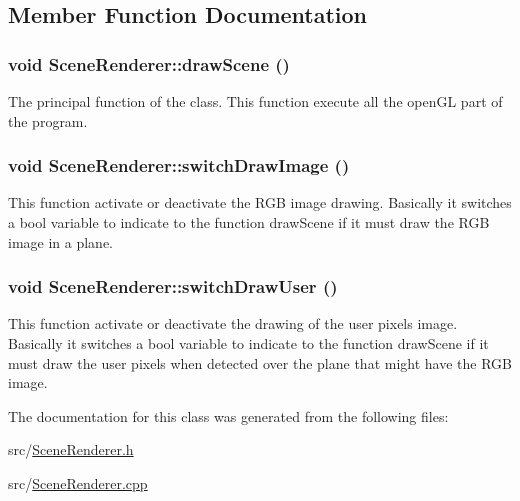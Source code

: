 \subsection{Member Function Documentation}
\hypertarget{classSceneRenderer_ae6ca19a65696503e8dea028219fd3fba}{
\subsubsection[{drawScene}]{\setlength{\rightskip}{0pt plus 5cm}void SceneRenderer::drawScene ()}}
\label{classSceneRenderer_ae6ca19a65696503e8dea028219fd3fba}
The principal function of the class. This function execute all the openGL part of the program. \hypertarget{classSceneRenderer_ab104ce38576705968a1ced2cdd16b178}{
\subsubsection[{switchDrawImage}]{\setlength{\rightskip}{0pt plus 5cm}void SceneRenderer::switchDrawImage ()}}
\label{classSceneRenderer_ab104ce38576705968a1ced2cdd16b178}
This function activate or deactivate the RGB image drawing. Basically it switches a bool variable to indicate to the function drawScene if it must draw the RGB image in a plane. \hypertarget{classSceneRenderer_a43045a5662099ef3064f902566875bcb}{
\subsubsection[{switchDrawUser}]{\setlength{\rightskip}{0pt plus 5cm}void SceneRenderer::switchDrawUser ()}}
\label{classSceneRenderer_a43045a5662099ef3064f902566875bcb}
This function activate or deactivate the drawing of the user pixels image. Basically it switches a bool variable to indicate to the function drawScene if it must draw the user pixels when detected over the plane that might have the RGB image. 

The documentation for this class was generated from the following files:\begin{DoxyCompactItemize}
\item 
src/\hyperlink{SceneRenderer_8h}{SceneRenderer.h}\item 
src/\hyperlink{SceneRenderer_8cpp}{SceneRenderer.cpp}\end{DoxyCompactItemize}
